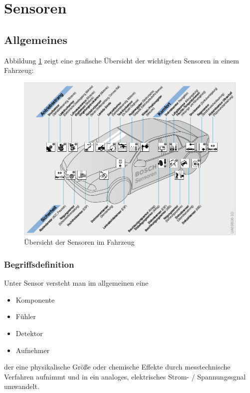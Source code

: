 \graphicspath{{./Images/Kapitel5/}}

\section{Sensoren}
	\subsection{Allgemeines} 
	
	Abbildung \ref{fig:TS01} zeigt eine grafische Übersicht der wichtigsten Sensoren in einem Fahrzeug:
			
	\begin{figure}[h!]
		\includegraphics[width=\textwidth] {sensor_uebersicht.png}
        \caption{Übersicht der Sensoren im Fahrzeug \cite{BP01}}
        \label{fig:TS01}
	\end{figure}	
	
		\subsubsection{Begriffsdefinition}
	
        Unter Sensor versteht man im allgemeinen eine
        \begin{itemize}
            \item Komponente
            \item Fühler
            \item Detektor
            \item Aufnehmer
        \end{itemize}
            der eine physikalische Größe oder chemische Effekte durch messtechnische Verfahren aufnimmt und in ein analoges, elektrisches Strom- / Spannungssgnal umwandelt.
        
